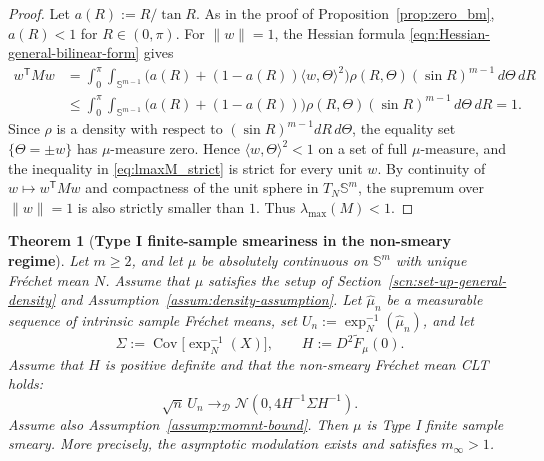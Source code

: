 \documentclass{amsart}
\newtheorem{theorem}{Theorem}[section]
\theoremstyle{definition}
\theoremstyle{remark}
\newcommand\0{\boldsymbol{0}}
\begin{document}
\begin{proof}
Let \(a(R):=R/\tan R\).  As in the proof of Proposition~\ref{prop:zero_bm}, \(a(R)<1\) for \(R\in(0,\pi)\).  For \(\|w\|=1\), the Hessian formula \eqref{eqn:Hessian-general-bilinear-form} gives
\begin{equation}\label{eq:lmaxM_strict}
\begin{aligned}
w^{\mathsf T}Mw
&=\int_0^\pi\!\!\int_{\mathbb S^{m-1}}
\Big(a(R)+(1-a(R))\langle w,\Theta\rangle^2\Big)
\rho(R,\Theta)(\sin R)^{m-1}\,d\Theta\,dR\\
&\le
\int_0^\pi\!\!\int_{\mathbb S^{m-1}}
\Big(a(R)+(1-a(R))\Big)
\rho(R,\Theta)(\sin R)^{m-1}\,d\Theta\,dR
=1 .
\end{aligned}
\end{equation}
Since \(\rho\) is a density with respect to \((\sin R)^{m-1}dR\,d\Theta\), the equality set \(\{\Theta=\pm w\}\) has \(\mu\)-measure zero.  Hence \(\langle w,\Theta\rangle^2<1\) on a set of full \(\mu\)-measure, and the inequality in \eqref{eq:lmaxM_strict} is strict for every unit \(w\).  By continuity of \(w\mapsto w^{\mathsf T}Mw\) and compactness of the unit sphere in \(T_N\mathbb S^m\), the supremum over \(\|w\|=1\) is also strictly smaller than \(1\).  Thus \(\lambda_{\max}(M)<1\).
\end{proof}

\begin{theorem}[\textbf{Type I finite-sample smeariness in the non-smeary regime}]
\label{thm:typeI_hemisphere_general}
Let \(m\ge2\), and let \(\mu\) be absolutely continuous on \(\mathbb S^m\) with unique Fr\'echet mean \(N\).  Assume that \(\mu\) satisfies the setup of Section~\ref{scn:set-up-general-density} and Assumption~\ref{assum:density-assumption}.  Let \(\widehat\mu_n\) be a measurable sequence of intrinsic sample Fr\'echet means, set \(U_n:=\exp_N^{-1}(\widehat\mu_n)\), and let
\[
    \Sigma:=\operatorname{Cov}\bigl[\exp_N^{-1}(X)\bigr],
    \qquad
    H:=D^2\widetilde F_\mu(0).
\]
Assume that \(H\) is positive definite and that the non-smeary Fr\'echet mean CLT holds:
\[
    \sqrt n\,U_n\rightarrow_{\mathcal D}\mathcal N(0,4H^{-1}\Sigma H^{-1}) .
\]
Assume also Assumption~\ref{assump:momnt-bound}.  Then \(\mu\) is Type I finite sample smeary.  More precisely, the asymptotic modulation exists and satisfies \(m_\infty>1\).
\end{theorem}
\end{document}
